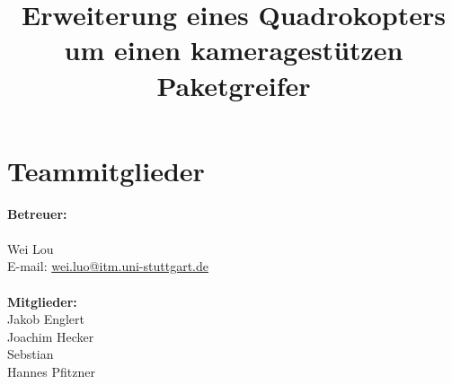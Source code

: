\documentclass[ngerman, 12pt, letterpaper]{article}
\title{Erweiterung eines Quadrokopters um einen kameragestützen Paketgreifer}
\begin{document}
\maketitle
\newpage

\tableofcontents
\newpage
\section{Teammitglieder}
\textbf {Betreuer:}\\
\\
 Wei Lou\\
\hfill  E-mail: \href{wei.luo@itm.uni-stuttgart.de}{wei.luo@itm.uni-stuttgart.de}\\
\\
\textbf {Mitglieder:}\\
Jakob Englert\\
Joachim Hecker\\
Sebstian\\
Hannes Pfitzner\\













\end{document}
